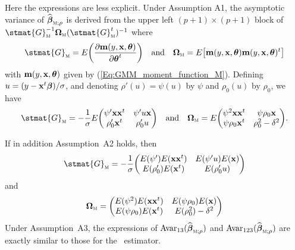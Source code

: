 Here the expressions are less explicit. Under Assumption A1, the asymptotic
variance of $\sthat{\boldsymbol\beta}_{\stsc{M};\rho}$ is derived from the
upper left $(p+1) \times (p+1)$ block of $\stmat{G}_\stsc{M}^{-1}
\boldsymbol\Omega_\stsc{M} (\stmat{G}_\stsc{M}^t)^{-1}$ where
\[
    \stmat{G}_\stsc{M} = 
    E\left(\frac{\partial\stvec{m}(y,\stvec{x},\boldsymbol\theta)}
                {\partial\boldsymbol\theta^t}\right)
    \quad\text{and}\quad
    \boldsymbol\Omega_\stsc{M} = 
    E\left[\stvec{m}(y,\stvec{x},\boldsymbol\theta) 
           \stvec{m}(y,\stvec{x},\boldsymbol\theta)^t\right]
\]
with $\mathbf m(y,\mathbf x,\boldsymbol\theta)$ given by
(\ref{Eq:GMM_moment_function_M}). Defining $u =
(y-\mathbf x^t\boldsymbol\beta)/\sigma$, and denoting $\rho'(u) =
\psi(u)$ by $\psi$ and $\rho_0(u)$ by $\rho_0$, we have
\[
    \stmat{G}_\stsc{M} = - \frac{1}{\sigma} E
    \begin{pmatrix}
        \psi'\stvec{x}\stvec{x}^t & \psi'u\stvec{x}\\
        \rho_0'\stvec{x}^t        & \rho_0'u
    \end{pmatrix}
    \quad\text{and}\quad
    \boldsymbol\Omega_\stsc{M} = E
    \begin{pmatrix}
        \psi^2\stvec{x}\stvec{x}^t & \psi\rho_0\stvec{x}\\
        \psi\rho_0\stvec{x}^t      & \rho_0^2-\delta^2
    \end{pmatrix}.
\]

If in addition Assumption~A2 holds, then
\[
    \stmat{G}_\stsc{M} = -\frac{1}{\sigma} 
    \begin{pmatrix}
        E(\psi') E(\stvec{x}\stvec{x}^t) & E(\psi'u) E(\stvec{x}) \\
        E(\rho_0') E(\stvec{x}^t)        & E(\rho_0'u)
    \end{pmatrix}
\]
and
\[
    \boldsymbol\Omega_\stsc{M} = 
    \begin{pmatrix}
        E(\psi^2) E(\stvec{x}\stvec{x}^t) & E(\psi\rho_0) E(\stvec{x}) \\
        E(\psi\rho_0) E(\stvec{x}^t)      & E(\rho_0^2) - \delta^2
    \end{pmatrix}
\]
Under Assumption~A3, the expressions of 
$\mathrm{Avar}_{13}(\sthat{\boldsymbol\beta}_{\stsc{M};\rho})$ and 
$\mathrm{Avar}_{123}(\sthat{\boldsymbol\beta}_{\stsc{M};\rho})$ are
exactly similar to those for the ~estimator.


\endinput
